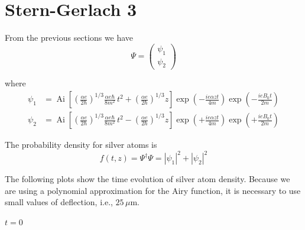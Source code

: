 

\section*{Stern-Gerlach 3}

From the previous sections we have
\begin{equation*}
\Psi=\begin{pmatrix}\psi_1\\\psi_2\end{pmatrix}
\end{equation*}

where
\begin{align*}
\psi_1&=\operatorname{Ai}\left[
\left(\frac{\alpha e}{2\hbar}\right)^{1/3}
\frac{\alpha e\hbar}{8m^2}\,t^2
+\left(\frac{\alpha e}{2\hbar}\right)^{1/3}z\right]
\exp\left(-\frac{ie\alpha zt}{4m}\right)
\exp\left(-\frac{ieB_0t}{2m}\right)
\\[1ex]
\psi_2&=\operatorname{Ai}\left[
\left(\frac{\alpha e}{2\hbar}\right)^{1/3}
\frac{\alpha e\hbar}{8m^2}\,t^2
-\left(\frac{\alpha e}{2\hbar}\right)^{1/3}z\right]
\exp\left(+\frac{ie\alpha zt}{4m}\right)
\exp\left(+\frac{ieB_0t}{2m}\right)
\end{align*}

The probability density for silver atoms is
\begin{equation*}
f(t,z)=\Psi^\dag\Psi=|\psi_1|^2+|\psi_2|^2
\end{equation*}

The following plots show the time evolution
of silver atom density.
Because we are using a polynomial approximation
for the Airy function, it is necessary to use
small values of deflection, i.e., $25\,\text{$\mu$m}$.

\bigskip
$t=0$

